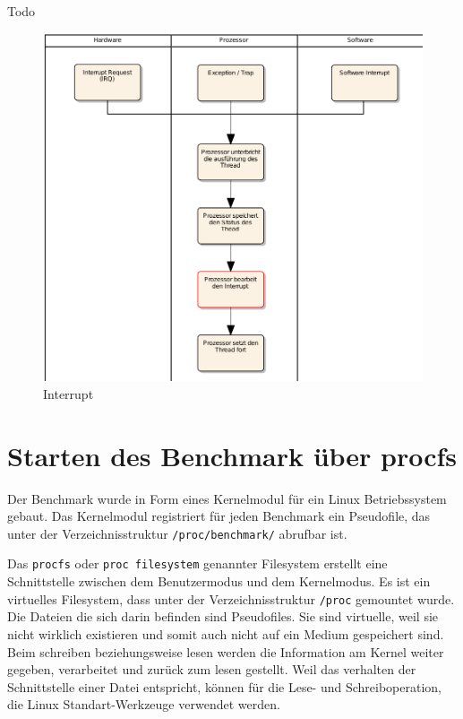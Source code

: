 Todo

\begin{figure}[H]
\centering
\includegraphics[width=1.0\textwidth]{images/interrupt_ea.pdf}
\caption{Interrupt}
\label{fig:Interrupt}
\end{figure}

\section{Starten des Benchmark über procfs}

Der Benchmark wurde in Form eines Kernelmodul für ein Linux Betriebssystem gebaut. Das Kernelmodul registriert für jeden Benchmark ein Pseudofile, das unter der Verzeichnisstruktur \texttt{/proc/benchmark/} abrufbar ist.
\par
Das \texttt{procfs} oder \texttt{proc filesystem} genannter Filesystem erstellt eine Schnittstelle zwischen dem Benutzermodus und dem Kernelmodus. Es ist ein virtuelles Filesystem, dass unter der Verzeichnisstruktur \texttt{/proc} gemountet wurde\cite{mauerer2010professional}. Die Dateien die sich darin befinden sind Pseudofiles. Sie sind virtuelle, weil sie nicht wirklich existieren und somit auch nicht auf ein Medium gespeichert sind. Beim schreiben beziehungsweise lesen werden die Information am Kernel weiter gegeben, verarbeitet und zurück zum lesen gestellt. Weil das verhalten der Schnittstelle einer Datei entspricht, können für die Lese- und Schreiboperation, die Linux Standart-Werkzeuge verwendet werden.

